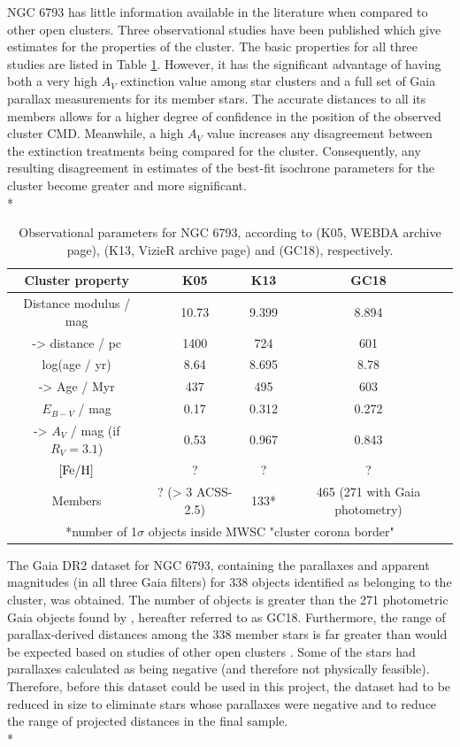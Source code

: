 \documentclass[12pt, a4paper]{report}
\begin{document}
NGC 6793 has little information available in the literature when compared to other open clusters. Three observational studies have been published which give estimates for the properties of the cluster. The basic properties for all three studies are listed in Table \ref{NGC6793_obs}. However, it has the significant advantage of having both a very high $A_{V}$ extinction value among star clusters and a full set of Gaia parallax measurements for its member stars. The accurate distances to all its members allows for a higher degree of confidence in the position of the observed cluster CMD. Meanwhile, a high $A_{V}$ value increases any disagreement between the extinction treatments being compared for the cluster. Consequently, any resulting disagreement in estimates of the best-fit isochrone parameters for the cluster become greater and more significant. \\*

\begin{table}
\begin{center}
\begin{tabular}{cccc}
\hline
Cluster property & K05 & K13 & GC18 \\
\hline
Distance modulus / mag & 10.73 & 9.399 & 8.894 \\
-> distance / pc & 1400 & 724 & 601 \\
log(age / yr) & 8.64 & 8.695 & 8.78 \\
-> Age / Myr & 437 & 495 & 603 \\
$E_{B-V}$ / mag & 0.17 & 0.312 & 0.272 \\
-> $A_{V}$ / mag (if $R_{V} = 3.1$) & 0.53 & 0.967 & 0.843 \\
$\textnormal{[Fe/H]}$ & ? & ? & ? \\
Members & ? (> 3 ACSS-2.5) & 133* & 465 (271 with Gaia photometry) \\
\hline
\multicolumn{4}{c}{*number of 1$\sigma$ objects inside MWSC "cluster corona border"} \\
\end{tabular}
\caption{Observational parameters for NGC 6793, according to \cite{2005A&A...438.1163K} (K05, WEBDA archive page), \cite{2013A&A...558A..53K} (K13, VizieR archive page) and \cite{2018A&A...616A..10G} (GC18), respectively.}
\label{NGC6793_obs}
\end{center}
\end{table}


The Gaia DR2 dataset for NGC 6793, containing the parallaxes and apparent magnitudes (in all three Gaia filters) for 338 objects identified as belonging to the cluster, was obtained. The number of objects is greater than the 271 photometric Gaia objects found by \cite{2018A&A...616A..10G}, hereafter referred to as GC18. Furthermore, the range of parallax-derived distances among the 338 member stars is far greater than would be expected based on studies of other open clusters \citep{2006A&A...456..523S}. Some of the stars had parallaxes calculated as being negative (and therefore not physically feasible). Therefore, before this dataset could be used in this project, the dataset had to be reduced in size to eliminate stars whose parallaxes were negative and to reduce the range of projected distances in the final sample. \\*
\end{document}
